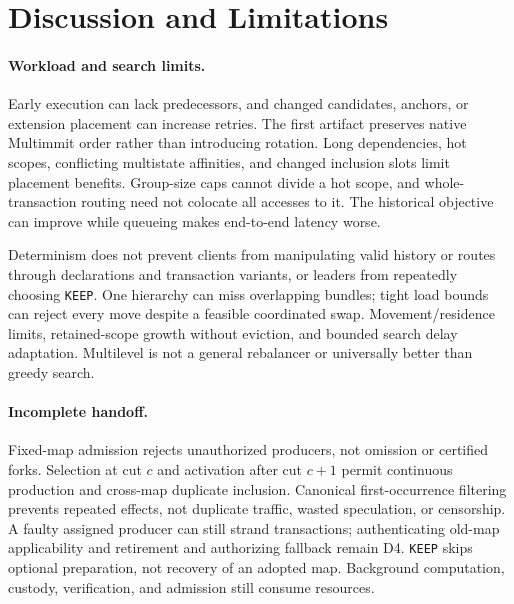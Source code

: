 \section{Discussion and Limitations}
\label{sec:discussion}

\paragraph{Workload and search limits.}
Early execution can lack predecessors, and changed candidates, anchors, or extension placement can increase retries. The first artifact preserves native Multimmit order rather than introducing rotation. Long dependencies, hot scopes, conflicting multistate affinities, and changed inclusion slots limit placement benefits. Group-size caps cannot divide a hot scope, and whole-transaction routing need not colocate all accesses to it. The historical objective can improve while queueing makes end-to-end latency worse.

Determinism does not prevent clients from manipulating valid history or routes through declarations and transaction variants, or leaders from repeatedly choosing \texttt{KEEP}. One hierarchy can miss overlapping bundles; tight load bounds can reject every move despite a feasible coordinated swap. Movement/residence limits, retained-scope growth without eviction, and bounded search delay adaptation. Multilevel is not a general rebalancer or universally better than greedy search.

\paragraph{Incomplete handoff.}
Fixed-map admission rejects unauthorized producers, not omission or certified forks. Selection at cut \(c\) and activation after cut \(c+1\) permit continuous production and cross-map duplicate inclusion. Canonical first-occurrence filtering prevents repeated effects, not duplicate traffic, wasted speculation, or censorship. A faulty assigned producer can still strand transactions; authenticating old-map applicability and retirement and authorizing fallback remain D4. \texttt{KEEP} skips optional preparation, not recovery of an adopted map. Background computation, custody, verification, and admission still consume resources.

